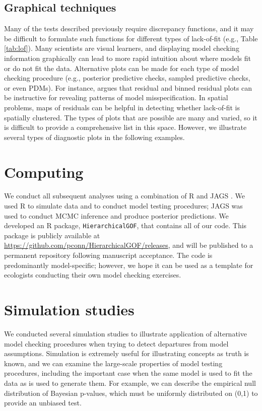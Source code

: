 \documentclass[12pt,english]{article}
\begin{document}
\begin{spacing}{1.9}
\subsection{Graphical techniques}

Many of the tests described previously require discrepancy functions, and it may be difficult to formulate such functions for different types of lack-of-fit (e.g., Table \ref{tab:lof}).  Many scientists are visual learners, and displaying model checking information graphically can lead to more rapid intuition about where models fit or do not fit the data.  Alternative plots can be made for each type of model checking procedure (e.g., posterior predictive checks, sampled predictive checks, or even PDMs).  For instance, \citet{GelmanEtAl2014} argues that residual and binned residual plots can be instructive for revealing patterns of model misspecification.  In spatial problems, maps of residuals can be helpful in detecting whether lack-of-fit is spatially clustered.  The types of plots that are possible are many and varied, so it is difficult to provide a comprehensive list in this space. However, we illustrate several types of diagnostic plots in the following examples.

\section{Computing}

We conduct all subsequent analyses using a combination of R \citep{RTeam2015} and JAGS \citep{Plummer2003}.  We used R to simulate data and to conduct model testing procedures; JAGS was used to conduct MCMC inference and produce posterior predictions. We developed an R package, \texttt{HierarchicalGOF}, that contains all of our code.  This package is publicly available at \url{https://github.com/pconn/HierarchicalGOF/releases}, and will be published to a permanent repository following manuscript acceptance. The code is predominantly model-specific; however, we hope it can be used as a template for ecologists conducting their own model checking exercises.


\section{Simulation studies}

We conducted several simulation studies to illustrate application of alternative model checking procedures when trying to detect departures from model assumptions.  Simulation is extremely useful for illustrating concepts as truth is known, and we can examine the large-scale properties of model testing procedures, including the important case when the same model is used to fit the data as is used to generate them.  For example, we can describe the empirical null distribution of Bayesian p-values, which must be uniformly distributed on (0,1) to provide an unbiased test.


\end{spacing}
\end{document}
